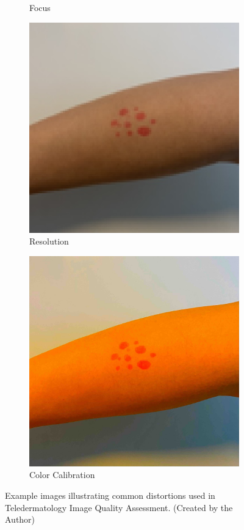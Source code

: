 \begin{figure}[ht]
\begin{subfigure}[b]{0.24\textwidth}
        \caption{Focus}
        \label{fig:focus}
    \end{subfigure}
    \hfill
    \begin{subfigure}[b]{0.24\textwidth}
        \includegraphics[width=\textwidth]{img/Resolution.jpg}
        \caption{Resolution}
        \label{fig:resol}
    \end{subfigure}
    \hfill
    \begin{subfigure}[b]{0.24\textwidth}
        \includegraphics[width=\textwidth]{img/Color.jpg}
        \caption{Color Calibration}
        \label{fig:cc}
    \end{subfigure}
    \caption{Example images illustrating common distortions used in Teledermatology Image Quality Assessment. (Created by the Author)}
    \label{fig:quality_criteria}
\end{figure}
